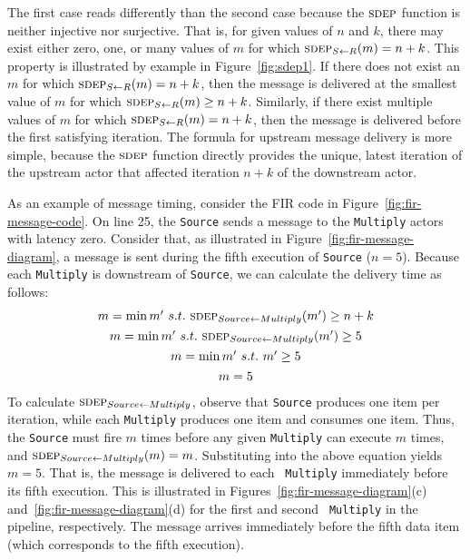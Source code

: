 The first case reads differently than the second case because the
$\textsc{sdep}$ function is neither injective nor surjective.  That is, for
given values of $n$ and $k$, there may exist either zero, one, or many
values of $m$ for which $\textsc{sdep}_{S \small{\leftarrow} R}(m)=n+k$.  This property is
illustrated by example in Figure~\ref{fig:sdep1}.  If there does not
exist an $m$ for which $\textsc{sdep}_{S \small{\leftarrow} R}(m)=n+k$, then the message is
delivered at the smallest value of $m$ for which $\textsc{sdep}_{S \small{\leftarrow} R}(m) \ge
n+k$.  Similarly, if there exist multiple values of $m$ for which
$\textsc{sdep}_{S \small{\leftarrow} R}(m)=n+k$, then the message is delivered before the first
satisfying iteration.  The formula for upstream message delivery is
more simple, because the $\textsc{sdep}$ function directly provides the
unique, latest iteration of the upstream actor that affected iteration
$n+k$ of the downstream actor.

As an example of message timing, consider the FIR code in
Figure~\ref{fig:fir-message-code}.  On line 25, the {\tt Source} sends
a message to the {\tt Multiply} actors with latency zero.  Consider
that, as illustrated in Figure~\ref{fig:fir-message-diagram}, a
message is sent during the fifth execution of {\tt Source} ($n = 5$).
Because each {\tt Multiply} is downstream of {\tt Source}, we can
calculate the delivery time as follows:
\begin{equation*}
\begin{array}{c}
m = \min m'~s.t.~\textsc{sdep}_{Source \small{\leftarrow} Multiply}(m') \ge n + k \\[0.9Ex]
m = \min m'~s.t.~\textsc{sdep}_{Source \small{\leftarrow} Multiply}(m') \ge 5 \\[0.9Ex]
m = \min m'~s.t.~m' \ge 5 \\[0.9Ex]
m = 5
\end{array}
\end{equation*}
To calculate $\textsc{sdep}_{Source \small{\leftarrow} Multiply}$, observe that {\tt Source}
produces one item per iteration, while each {\tt Multiply} produces
one item and consumes one item.  Thus, the {\tt Source} must fire $m$
times before any given {\tt Multiply} can execute $m$ times, and
$\textsc{sdep}_{Source \small{\leftarrow} Multiply}(m) = m$.  Substituting into the above
equation yields $m=5$.  That is, the message is delivered to each {\tt
Multiply} immediately before its fifth execution.  This is illustrated
in Figures~\ref{fig:fir-message-diagram}(c)
and~\ref{fig:fir-message-diagram}(d) for the first and second {\tt
Multiply} in the pipeline, respectively.  The message arrives
immediately before the fifth data item (which corresponds to the fifth
execution).

